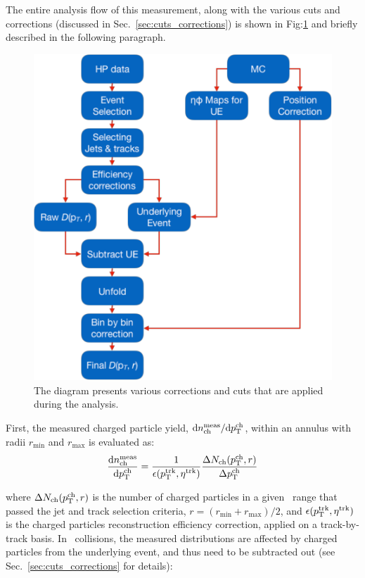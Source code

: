 The entire analysis flow of this measurement, along with the various cuts and corrections (discussed in Sec.~\ref{sec:cuts_corrections}) is shown in Fig:\ref{Fig:analysis_flow} and briefly described in the following paragraph.

\begin{figure}
\centerline{
\includegraphics[width=20.cm]{figures_general/Shape_analyses_flow.pdf}
}
\caption{The diagram presents various corrections and cuts that are applied during the analysis.}
\label{Fig:analysis_flow}
\end{figure}

First, the measured charged particle yield, $\text{d}n^{\text{meas}}_{\text{ch}}/\text{d}\mbox{$p_{{\mathrm{T}}}^{\mathrm{ch}}$}$, within an annulus with radii $r_{\text{min}}$ and $r_{\text{max}}$ is evaluated as:
\begin{equation}
\frac{\text{d}n^{\text{meas}}_{\text{ch}}}{\text{d}\pTch} = \frac{1}{\epsilon(\pttrk, \etatrk)} \frac{\Delta N_{\text{ch}} (\pTch, r)}{\Delta \pTch}
\end{equation}

where $\Delta N_{\text{ch}} (\mbox{$p_{{\mathrm{T}}}^{\mathrm{ch}}$}, r)$ is the number of charged particles in a given \pTch\ range that passed the jet and track selection criteria, $r = (r_{\text{min}} + r_{\text{max}}) / 2$, and $\epsilon(\pttrk, \etatrk)$ is the charged particles reconstruction efficiency correction, applied on a track-by-track basis. In \pbpb\ collisions, the measured distributions are affected by charged particles from the underlying event, and thus need to be subtracted out (see Sec.~\ref{sec:cuts_corrections} for details):

